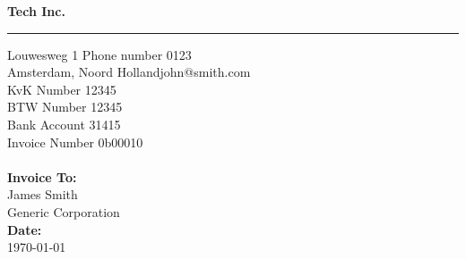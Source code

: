 \documentclass{invoice} %
\def \tab {\hspace*{3ex}} %
\begin{document}

\hfil{\Huge\bf Tech Inc.}\hfil %
\bigskip\break %
\hrule %

Louwesweg 1 \hfill Phone number 0123 \\
Amsterdam, Noord Holland\hfill john@smith.com \\
KvK Number \hfill 12345 \\
BTW Number \hfill 12345 \\
Bank Account \hfill 31415 \\
Invoice Number \hfill 0b00010
\\ \\
{\bf Invoice To:} \\
\tab James Smith \\ %
\tab Generic Corporation \\ %

{\bf Date:} \\
\tab \today \\ %


\begin{invoiceTable}




%

\subtotal %


\end{invoiceTable}

\end{document}
